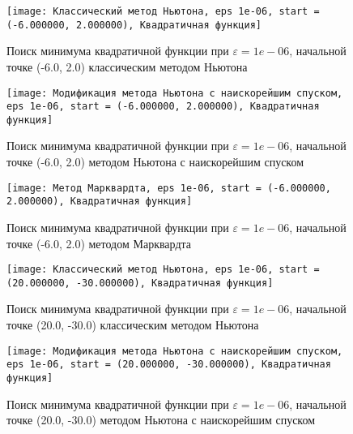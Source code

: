             \begin{figure}[H]
	        \centering
	        \texttt{[image: Классический метод Ньютона, eps 1e-06, start = (-6.000000, 2.000000), Квадратичная функция]}%
	        \caption{Поиск минимума квадратичной функции при $\varepsilon = 1e-06$, начальной точке (-6.0, 2.0) классическим методом Ньютона}
	        \vspace*{-1.2cm}
            \end{figure}
            
            \begin{figure}[H]
	        \centering
	        \texttt{[image: Модификация метода Ньютона с наискорейшим спуском, eps 1e-06, start = (-6.000000, 2.000000), Квадратичная функция]}%
	        \caption{Поиск минимума квадратичной функции при $\varepsilon = 1e-06$, начальной точке (-6.0, 2.0) методом Ньютона с наискорейшим спуском}
	        \vspace*{-1.2cm}
            \end{figure}
            
            \begin{figure}[H]
	        \centering
	        \texttt{[image: Метод Марквардта, eps 1e-06, start = (-6.000000, 2.000000), Квадратичная функция]}%
	        \caption{Поиск минимума квадратичной функции при $\varepsilon = 1e-06$, начальной точке (-6.0, 2.0) методом Марквардта}
	        \vspace*{-1.2cm}
            \end{figure}
            
            \begin{figure}[H]
	        \centering
	        \texttt{[image: Классический метод Ньютона, eps 1e-06, start = (20.000000, -30.000000), Квадратичная функция]}%
	        \caption{Поиск минимума квадратичной функции при $\varepsilon = 1e-06$, начальной точке (20.0, -30.0) классическим методом Ньютона}
	        \vspace*{-1.2cm}
            \end{figure}
            
            \begin{figure}[H]
	        \centering
	        \texttt{[image: Модификация метода Ньютона с наискорейшим спуском, eps 1e-06, start = (20.000000, -30.000000), Квадратичная функция]}%
	        \caption{Поиск минимума квадратичной функции при $\varepsilon = 1e-06$, начальной точке (20.0, -30.0) методом Ньютона с наискорейшим спуском}
	        \vspace*{-1.2cm}
            \end{figure}
            
